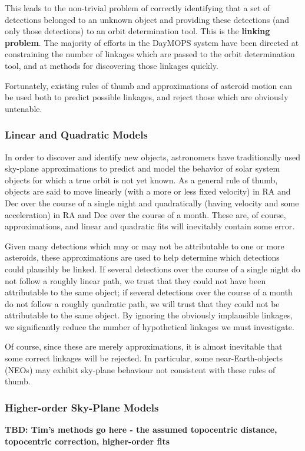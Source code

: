 This leads to the non-trivial problem of correctly identifying that a
set of detections belonged to an unknown object and providing these
detections (and only those detections) to an orbit determination tool.
This is the \textbf{ linking problem}.  The majority of efforts in
the DayMOPS system have been directed at constraining the number of
linkages which are passed to the orbit determination tool, and at
methods for discovering those linkages quickly.

Fortunately, existing rules of thumb and approximations of asteroid
motion can be used both to predict possible linkages, and reject those
which are obviously untenable.

\subsubsection{Linear and Quadratic Models}
In order to discover and identify new objects, astronomers have
traditionally used sky-plane approximations to predict and model the
behavior of solar system objects for which a true orbit is not yet
known.  As a general rule of thumb, objects are said to move linearly
(with a more or less fixed velocity) in RA and Dec over the course of
a single night and quadratically (having velocity and some
acceleration) in RA and Dec over the course of a month.  These are, of
course, approximations, and linear and quadratic fits will inevitably
contain some error.

Given many detections which may or may not be attributable to one or
more asteroids, these approximations are used to help determine which
detections could plausibly be linked.  If several detections over the
course of a single night do not follow a roughly linear path, we trust
that they could not have been attributable to the same object; if
several detections over the course of a month do not follow a roughly
quadratic path, we will trust that they could not be attributable to
the same object.  By ignoring the obviously implausible linkages, we
significantly reduce the number of hypothetical linkages we must
investigate.

Of course, since these are merely approximations, it is almost
inevitable that some correct linkages will be rejected.  In
particular, some near-Earth-objects (NEOs) may exhibit sky-plane
behaviour not consistent with these rules of thumb.


\subsubsection{Higher-order Sky-Plane Models}
\textbf{TBD: Tim's methods go here - the assumed topocentric distance, topocentric correction, higher-order fits}


